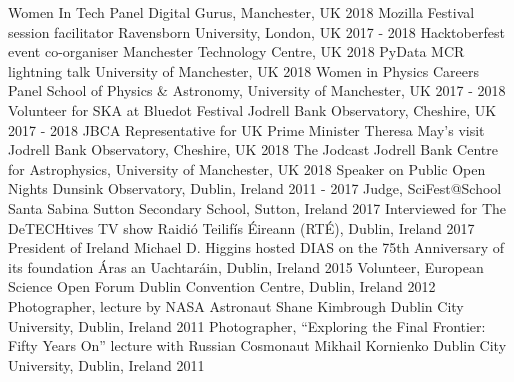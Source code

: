 \begin{cvpress}
   \cvpres
   {Women In Tech Panel}
    {Digital Gurus, Manchester, UK}
    {2018}
   \cvpres
   {Mozilla Festival session facilitator}
    {Ravensborn University, London, UK}
    {2017 - 2018}
   \cvpres
   {Hacktoberfest event co-organiser}
    {Manchester Technology Centre, UK}
    {2018}
   \cvpres
   {PyData MCR lightning talk}
    {University of Manchester, UK}
    {2018}
   \cvpres
   {Women in Physics Careers Panel}
    {School of Physics \& Astronomy, University of Manchester, UK}
    {2017 - 2018}
   \cvpres
   {Volunteer for SKA at Bluedot Festival}
    {Jodrell Bank Observatory, Cheshire, UK}
    {2017 - 2018}
   \cvpres
   {JBCA Representative for UK Prime Minister Theresa May's visit}
    {Jodrell Bank Observatory, Cheshire, UK}
    {2018}
   \cvpres
   {The Jodcast}
    {Jodrell Bank Centre for Astrophysics, University of Manchester, UK}
    {2018}
   \cvpres
   {Speaker on Public Open Nights}
    {Dunsink Observatory, Dublin, Ireland}
    {2011 - 2017}
   \cvpres
   {Judge, SciFest@School}
    {Santa Sabina Sutton Secondary School, Sutton, Ireland}
    {2017}
   \cvpres
   {Interviewed for The DeTECHtives TV show}
    {Raidi{\'o} Teilif{\'i}s {\'E}ireann (RT{\'E}), Dublin, Ireland}
    {2017}
   \cvpres
   {President of Ireland Michael D. Higgins hosted DIAS on the 75th Anniversary of its foundation}
    {{\'A}ras an Uachtar{\'a}in, Dublin, Ireland}
    {2015}
   \cvpres
   {Volunteer, European Science Open Forum}
    {Dublin Convention Centre, Dublin, Ireland}
    {2012}
   \cvpres
   {Photographer, lecture by NASA Astronaut Shane Kimbrough}
    {Dublin City University, Dublin, Ireland}
    {2011}
   \cvpres
   {Photographer, ``Exploring the Final Frontier: Fifty Years On'' lecture with Russian Cosmonaut Mikhail Kornienko}
    {Dublin City University, Dublin, Ireland}
    {2011}
\end{cvpress}


